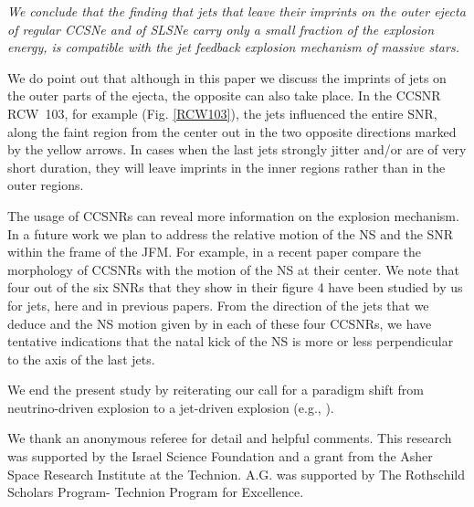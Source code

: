 \documentclass[12pt,preprint,a4paper]{aastex}
\begin{document}
\textit{We conclude that the finding that jets that leave their imprints on the outer ejecta of regular CCSNe and of SLSNe carry only a small fraction of the explosion energy, is compatible with the jet feedback explosion mechanism of massive stars. }
 
 We do point out that although in this paper we discuss the imprints of jets on the outer parts of the ejecta, the opposite can also take place. In the CCSNR RCW~103, for example (Fig. \ref{RCW103}), the jets influenced the entire SNR, along the faint region from the center out in the two opposite directions marked by the yellow arrows. In cases when the last jets strongly jitter and/or are of very short duration, they will leave imprints in the inner regions rather than in the outer regions. 

The usage of CCSNRs can reveal more information on the explosion mechanism. In a future work we plan to address the relative motion of the NS and the SNR within the frame of the JFM. 
For example, in a recent paper \cite{HollandAshfordetal2017} compare the morphology of CCSNRs with the motion of the NS at their center. We note that four out of the six SNRs that they show in their figure 4 have been studied by us for jets, here and in previous papers. From the direction of the jets that we deduce and the NS motion given by \cite{HollandAshfordetal2017} in each of these four CCSNRs, we have tentative indications that the natal kick of the NS is more or less perpendicular to the axis of the last jets. 

We end the present study by reiterating our call for a paradigm shift from neutrino-driven explosion to a jet-driven explosion (e.g., \citealt{Papishetal2015b, Soker2017a}). 
 
 We thank an anonymous referee for detail and helpful comments. This research was supported by the Israel Science Foundation and a grant from the Asher Space Research Institute at the Technion. A.G. was supported by The Rothschild Scholars Program- Technion Program for Excellence.
 
\end{document}
